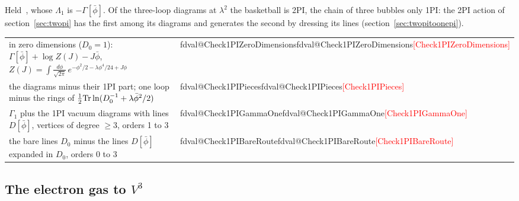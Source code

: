 \documentclass[11pt,a4paper]{article}
\makeatletter
\newcommand{\val}[1]{\ifcsname fdval@#1\endcsname\csname fdval@#1\endcsname\else\textcolor{red}{[#1]}\fi}
\makeatother
\begin{document}
Held~\cite{Eckhardt2023}, whose $\Lambda_1$ is $-\Gamma[\bar\phi]$. Of the three-loop diagrams at $\lambda^2$ the basketball is 2PI, the chain of three bubbles
only 1PI: the 2PI action of section~\ref{sec:twopi} has the first among its diagrams and generates the second by dressing its
lines (section~\ref{sec:twopitoonepi}).
\begin{result}
\begin{tabular}{@{}l@{\quad}l@{}}
in zero dimensions ($D_0=1$): $\Gamma[\bar\phi]+\log Z(J)-J\bar\phi$, $Z(J)=\int\frac{d\phi}{\sqrt{2\pi}}\,e^{-\phi^2/2-\lambda\phi^4/24+J\phi}$ & \val{Check1PIZeroDimensions}\\
the diagrams minus their 1PI part; one loop minus the rings of $\frac12{\rm Tr}\ln(D_0^{-1}+\lambda\bar\phi^2/2)$ & \val{Check1PIPieces}\\
$\Gamma_1$ plus the 1PI vacuum diagrams with lines $D[\bar\phi]$, vertices of degree $\ge3$, orders 1 to 3 & \val{Check1PIGammaOne}\\
the bare lines $D_0$ minus the lines $D[\bar\phi]$ expanded in $D_0$, orders 0 to 3 & \val{Check1PIBareRoute}
\end{tabular}
\end{result}

\subsection{The electron gas to \texorpdfstring{$V^3$}{V3}}\label{sec:onepifermions}
\end{document}
